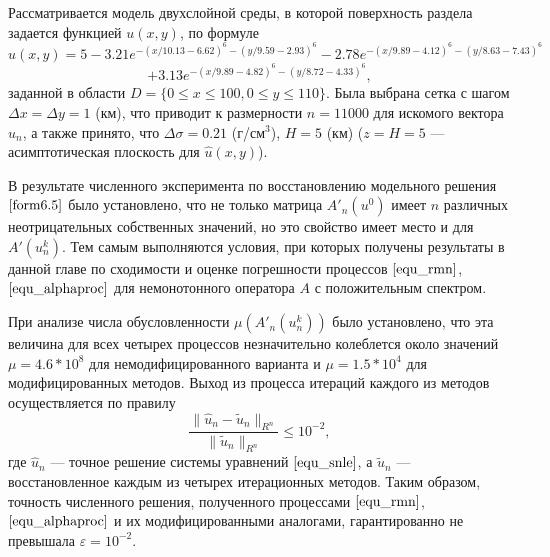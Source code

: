 Рассматривается модель двухслойной среды, в которой поверхность раздела задается функцией $u(x,y)$, по формуле %
$$
\hat{u}(x,y)=5-3.21e^{-(x/10.13-6.62)^6-(y/9.59-2.93)^6}-
2.78e^{-(x/9.89-4.12)^6-(y/8.63-7.43)^6}$$
\begin{equation}\label{form6.5}
+3.13e^{-(x/9.89-4.82)^6-(y/8.72-4.33)^6},
\end{equation}
заданной в области $D=\{0\le x\le 100, 0\le y \le 110\}$. Была выбрана сетка с шагом $\Delta x=\Delta y=1$ (км), что приводит к размерности $n=11000$ для искомого вектора $u_n$, а также принято, что $\Delta\sigma=0.21$ (г/см$^3$), $H=5$ (км) ($z=H=5$ --- асимптотическая плоскость для $\hat{u}(x,y)$).

В результате численного эксперимента по восстановлению модельного решения $\eqref{form6.5}$ было установлено, что не только матрица $A'_n(u^0)$ имеет $n$ различных неотрицательных собственных значений, но это свойство имеет место и для $A'(u_n^k)$. Тем самым выполняются условия, при которых получены результаты в данной главе по сходимости и оценке погрешности процессов $\eqref{equ_rmn}$, $\eqref{equ_alphaproc}$ для немонотонного оператора $A$ с положительным спектром. 

При анализе числа обусловленности $\mu(A'_n(u_n^k))$ было установлено, что эта величина для всех четырех процессов незначительно колеблется около значений $\mu=4.6 * 10^{8}$ для немодифицированного варианта и $\mu=1.5 * 10^{4}$ для модифицированных методов. Выход из процесса итераций каждого из методов осуществляется по правилу
\begin{equation}\label{cond6.6}
\frac{\|\hat{u}_n-\tilde{u}_n\|_{R^n}}{\|\tilde{u}_n\|_{R^n}}\le 10^{-2},
\end{equation}
где $\hat{u}_n$ --- точное решение системы уравнений $\eqref{equ_snle}$, а $\tilde{u}_n$ --- восстановленное каждым из четырех итерационных методов. Таким образом, точность численного решения, полученного процессами $\eqref{equ_rmn}$, $\eqref{equ_alphaproc}$ и их модифицированными аналогами, гарантированно не превышала $\varepsilon=10^{-2}$.

